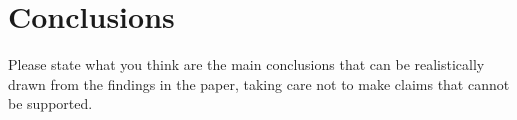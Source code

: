 \section*{Conclusions}
Please state what you think are the main conclusions that can be realistically drawn from the findings in the paper, taking care not to make claims that cannot be supported.
